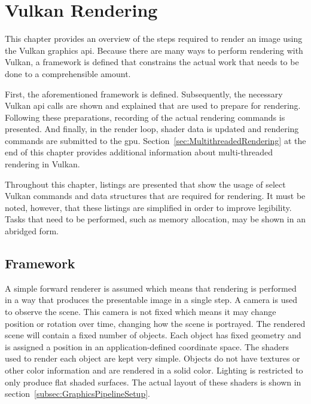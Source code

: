 
\chapter{Vulkan Rendering}
\label{cha:RenderPipeline}

  This chapter provides an overview of the steps required to render an image using the Vulkan graphics \gls{api}.
  Because there are many ways to perform rendering with Vulkan, a framework is defined that constrains the actual work that needs to be done to a comprehensible amount.

  First, the aforementioned framework is defined.
  Subsequently, the necessary Vulkan \gls{api} calls are shown and explained that are used to prepare for rendering.
  Following these preparations, recording of the actual rendering commands is presented.
  And finally, in the render loop, shader data is updated and rendering commands are submitted to the \gls{gpu}.
  Section~\ref{sec:MultithreadedRendering} at the end of this chapter provides additional information about multi-threaded rendering in Vulkan.

  Throughout this chapter, listings are presented that show the usage of select Vulkan commands and data structures that are required for rendering.
  It must be noted, however, that these listings are simplified in order to improve legibility.
  Tasks that need to be performed, such as memory allocation, may be shown in an abridged form.

  \section{Framework}
  \label{sec:Framework}
    A simple forward renderer is assumed which means that rendering is performed in a way that produces the presentable image in a single step.
    A camera is used to observe the scene.
    This camera is not fixed which means it may change position or rotation over time, changing how the scene is portrayed.
    The rendered scene will contain a fixed number of objects.
    Each object has fixed geometry and is assigned a position in an application-defined coordinate space.
    The shaders used to render each object are kept very simple.
    Objects do not have textures or other color information and are rendered in a solid color.
    Lighting is restricted to only produce flat shaded surfaces.
    The actual layout of these shaders is shown in section~\ref{subsec:GraphicsPipelineSetup}.

